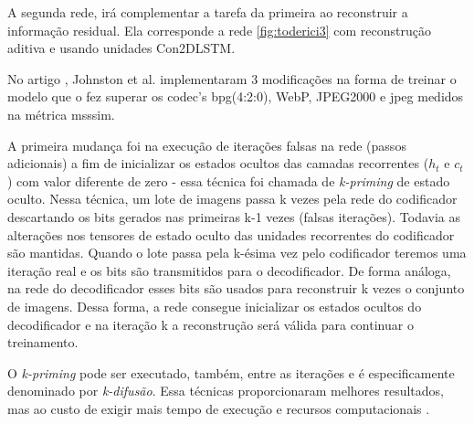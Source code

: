 A segunda rede, irá complementar a tarefa da primeira ao reconstruir a informação residual. Ela corresponde a rede \ref{fig:toderici3} com reconstrução aditiva e usando unidades Con2DLSTM. 



No artigo \cite{Priming2017Johnston}, Johnston et al. implementaram 3 modificações na forma de treinar o modelo que o fez superar os \acrshort{codec}'s \acrshort{bpg}(4:2:0), WebP, JPEG2000 e \acrshort{jpeg} medidos na métrica \acrshort{msssim}. 

A primeira mudança foi na execução de iterações falsas na rede (passos adicionais) a fim de inicializar os estados ocultos das camadas recorrentes ($h_t$ e $c_t$) com valor diferente de zero - essa técnica foi chamada de \textit{k-priming} de estado oculto.
Nessa técnica, um lote de imagens passa k vezes pela rede do codificador descartando os bits gerados nas primeiras k-1 vezes (falsas iterações). Todavia as alterações nos tensores de estado oculto das unidades recorrentes do codificador são mantidas. Quando o lote passa pela k-ésima vez pelo codificador teremos uma iteração real e os bits são transmitidos para o decodificador. 
De forma análoga, na rede do decodificador esses bits são usados para reconstruir k vezes o conjunto de imagens. Dessa forma, a rede consegue inicializar os estados ocultos do decodificador e na iteração k a reconstrução será válida para continuar o treinamento.    

O \textit{k-priming} pode ser executado, também, entre as iterações e é especificamente denominado por \textit{k-difusão}. Essa técnicas proporcionaram melhores resultados, mas ao custo de exigir mais tempo de execução e recursos computacionais \cite{Priming2017Johnston}. 


